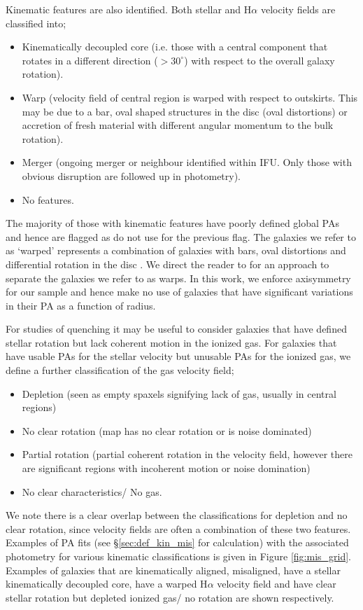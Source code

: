 Kinematic features are also identified. Both stellar and H$\alpha$ velocity fields are classified into;
\begin{itemize}
    \item Kinematically decoupled core (i.e. those with a central component that rotates in a different direction ($> 30^{\circ}$) with respect to the overall galaxy rotation).
    \item Warp (velocity field of central region is warped with respect to outskirts. This may be due to a bar, oval shaped structures in the disc (oval distortions) or accretion of fresh material with different angular momentum to the bulk rotation).
    \item Merger (ongoing merger or neighbour identified within IFU. Only those with obvious disruption are followed up in photometry).
    \item No features.
\end{itemize}
The majority of those with kinematic features have poorly defined global PAs and hence are flagged as do not use for the previous flag. The galaxies we refer to as `warped' represents a combination of galaxies with bars, oval distortions and differential rotation in the disc \citep[e.g.][]{barrera2014}. We direct the reader to \citet{stark2018} for an approach to separate the galaxies we refer to as warps. In this work, we enforce axisymmetry for our sample and hence make no use of galaxies that have significant variations in their PA as a function of radius.

For studies of quenching it may be useful to consider galaxies that have defined stellar rotation but lack coherent motion in the ionized gas. For galaxies that have usable PAs for the stellar velocity but unusable PAs for the ionized gas, we define a further classification of the gas velocity field;
\begin{itemize}
    \item Depletion (seen as empty spaxels signifying lack of gas, usually in central regions)
    \item No clear rotation (map has no clear rotation or is noise dominated)
    \item Partial rotation (partial coherent rotation in the velocity field, however there are significant regions with incoherent motion or noise domination)
    \item No clear characteristics/ No gas.
\end{itemize}
We note there is a clear overlap between the classifications for depletion and no clear rotation, since velocity fields are often a combination of these two features. 
Examples of PA fits (see \S\ref{sec:def_kin_mis} for calculation) with the associated photometry for various kinematic classifications is given in Figure \ref{fig:mis_grid}. Examples of galaxies that are kinematically aligned, misaligned, have a stellar kinematically decoupled core, have a warped H$\alpha$ velocity field and have clear stellar rotation but depleted ionized gas/ no rotation are shown respectively.

